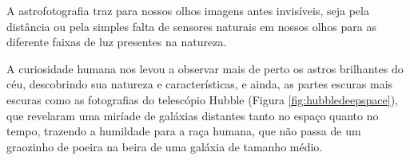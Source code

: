 \documentclass[
	article,			%
	12pt,				%
	oneside,			%
	a4paper,			%
	english,			%
	brazil,				%
	sumario=tradicional
	]{abntex2}
\begin{document}
A astrofotografia traz para nossos olhos imagens antes invisíveis, seja pela
distância ou pela simples falta de sensores naturais em nossos olhos para as 
diferente faixas de luz presentes na natureza.

A curiosidade humana nos levou a observar mais de perto os astros brilhantes do
céu, descobrindo sua natureza e características, e ainda, as partes escuras mais
escuras como as fotografias do telescópio Hubble (Figura \ref{fig:hubbledeepspace}),
que revelaram uma miríade de galáxias distantes tanto no espaço quanto no tempo,
trazendo a humildade para a raça humana, que não passa de um graozinho de poeira
na beira de uma galáxia de tamanho médio.


\newpage
\postextual{}


\end{document}
